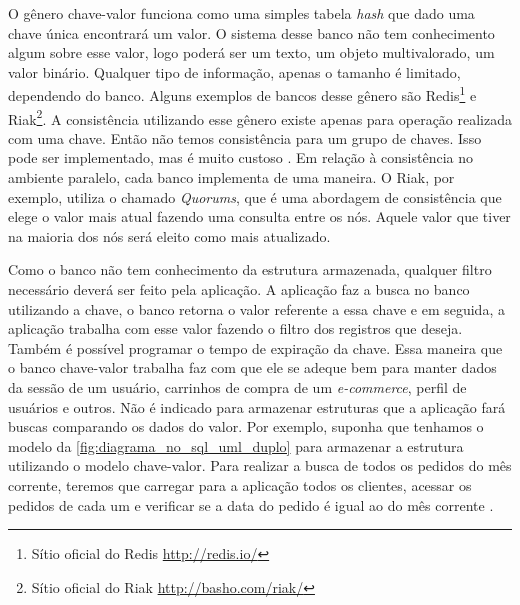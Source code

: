 O gênero chave-valor funciona como uma simples tabela \textit{hash} que dado uma chave única encontrará um valor. O sistema desse banco não tem conhecimento algum sobre esse valor, logo poderá ser um texto, um objeto multivalorado, um valor binário. Qualquer tipo de informação, apenas o tamanho é limitado, dependendo do banco. Alguns exemplos de bancos desse gênero são \ac{Redis}\footnote{Sítio oficial do Redis \url{http://redis.io/}} e Riak\footnote{Sítio oficial do Riak \url{http://basho.com/riak/}}.
A consistência utilizando esse gênero existe apenas para operação realizada com uma chave. Então não temos consistência para um grupo de chaves. Isso pode ser implementado, mas é muito custoso \cite{NoSQL}. Em relação à consistência no ambiente paralelo, cada banco implementa de uma maneira. O Riak, por exemplo, utiliza o chamado \textit{Quorums}, que é uma abordagem de consistência que elege o valor mais atual fazendo uma consulta entre os nós. Aquele valor que tiver na maioria dos nós será eleito como mais atualizado.

Como o banco não tem conhecimento da estrutura armazenada, qualquer filtro necessário deverá ser feito pela aplicação. A aplicação faz a busca no banco utilizando a chave, o banco retorna o valor referente a essa chave e em seguida, a aplicação trabalha com esse valor fazendo o filtro dos registros que deseja. Também é possível programar o tempo de expiração da chave. Essa maneira que o banco chave-valor trabalha faz com que ele se adeque bem para manter dados da sessão de um usuário, carrinhos de compra de um \textit{e-commerce}, perfil de usuários e outros. Não é indicado para armazenar estruturas que a aplicação fará buscas comparando os dados do valor. Por exemplo, suponha que tenhamos o modelo da \autoref{fig:diagrama_no_sql_uml_duplo} para armazenar a estrutura utilizando o modelo chave-valor. Para realizar a busca de todos os pedidos do mês corrente, teremos que carregar para a aplicação todos os clientes, acessar os pedidos de cada um e verificar se a data do pedido é igual ao do mês corrente \cite{NoSQL}.


